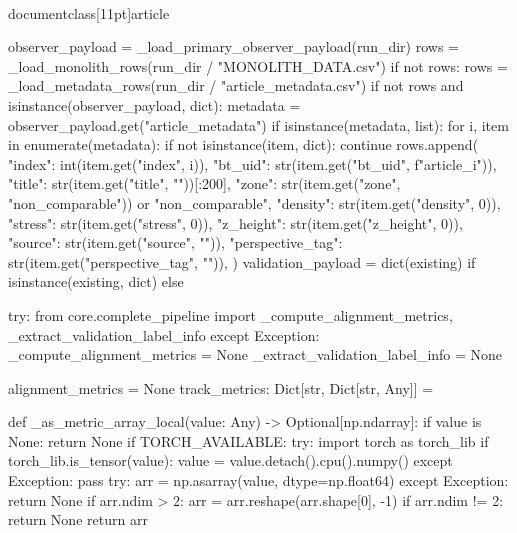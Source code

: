 \\documentclass[11pt]{article}
\begin{document}
\begin{CodeBlock}
    observer_payload = _load_primary_observer_payload(run_dir)
    rows = _load_monolith_rows(run_dir / "MONOLITH_DATA.csv")
    if not rows:
        rows = _load_metadata_rows(run_dir / "article_metadata.csv")
        if not rows and isinstance(observer_payload, dict):
            metadata = observer_payload.get("article_metadata")
            if isinstance(metadata, list):
                for i, item in enumerate(metadata):
                    if not isinstance(item, dict):
                        continue
                    rows.append(
                        {
                            "index": int(item.get("index", i)),
                            "bt_uid": str(item.get("bt_uid", f"article_{i}")),
                            "title": str(item.get("title", ""))[:200],
                            "zone": str(item.get("zone", "non_comparable")) or "non_comparable",
                            "density": str(item.get("density", 0)),
                            "stress": str(item.get("stress", 0)),
                            "z_height": str(item.get("z_height", 0)),
                            "source": str(item.get("source", "")),
                            "perspective_tag": str(item.get("perspective_tag", "")),
                        }
                    )
    validation_payload = dict(existing) if isinstance(existing, dict) else {}

    try:
        from core.complete_pipeline import _compute_alignment_metrics, _extract_validation_label_info
    except Exception:
        _compute_alignment_metrics = None
        _extract_validation_label_info = None

    alignment_metrics = None
    track_metrics: Dict[str, Dict[str, Any]] = {}

    def _as_metric_array_local(value: Any) -> Optional[np.ndarray]:
        if value is None:
            return None
        if TORCH_AVAILABLE:
            try:
                import torch as torch_lib
                if torch_lib.is_tensor(value):
                    value = value.detach().cpu().numpy()
            except Exception:
                pass
        try:
            arr = np.asarray(value, dtype=np.float64)
        except Exception:
            return None
        if arr.ndim > 2:
            arr = arr.reshape(arr.shape[0], -1)
        if arr.ndim != 2:
            return None
        return arr


\end{CodeBlock}
\end{document}
